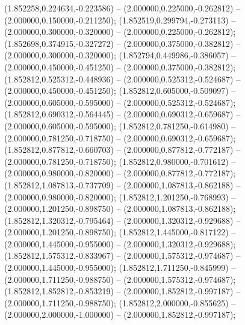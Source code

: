  (1.852258,0.224634,-0.223586) -- (2.000000,0.225000,-0.262812) -- (2.000000,0.150000,-0.211250);
 (1.852519,0.299794,-0.273113) -- (2.000000,0.300000,-0.320000) -- (2.000000,0.225000,-0.262812);
 (1.852698,0.374915,-0.327272) -- (2.000000,0.375000,-0.382812) -- (2.000000,0.300000,-0.320000);
 (1.852794,0.449986,-0.386057) -- (2.000000,0.450000,-0.451250) -- (2.000000,0.375000,-0.382812);
 (1.852812,0.525312,-0.448936) -- (2.000000,0.525312,-0.524687) -- (2.000000,0.450000,-0.451250);
 (1.852812,0.605000,-0.509097) -- (2.000000,0.605000,-0.595000) -- (2.000000,0.525312,-0.524687);
 (1.852812,0.690312,-0.564445) -- (2.000000,0.690312,-0.659687) -- (2.000000,0.605000,-0.595000);
 (1.852812,0.781250,-0.614980) -- (2.000000,0.781250,-0.718750) -- (2.000000,0.690312,-0.659687);
 (1.852812,0.877812,-0.660703) -- (2.000000,0.877812,-0.772187) -- (2.000000,0.781250,-0.718750);
 (1.852812,0.980000,-0.701612) -- (2.000000,0.980000,-0.820000) -- (2.000000,0.877812,-0.772187);
 (1.852812,1.087813,-0.737709) -- (2.000000,1.087813,-0.862188) -- (2.000000,0.980000,-0.820000);
 (1.852812,1.201250,-0.768993) -- (2.000000,1.201250,-0.898750) -- (2.000000,1.087813,-0.862188);
 (1.852812,1.320312,-0.795464) -- (2.000000,1.320312,-0.929688) -- (2.000000,1.201250,-0.898750);
 (1.852812,1.445000,-0.817122) -- (2.000000,1.445000,-0.955000) -- (2.000000,1.320312,-0.929688);
 (1.852812,1.575312,-0.833967) -- (2.000000,1.575312,-0.974687) -- (2.000000,1.445000,-0.955000);
 (1.852812,1.711250,-0.845999) -- (2.000000,1.711250,-0.988750) -- (2.000000,1.575312,-0.974687);
 (1.852812,1.852812,-0.853219) -- (2.000000,1.852812,-0.997187) -- (2.000000,1.711250,-0.988750);
 (1.852812,2.000000,-0.855625) -- (2.000000,2.000000,-1.000000) -- (2.000000,1.852812,-0.997187);
